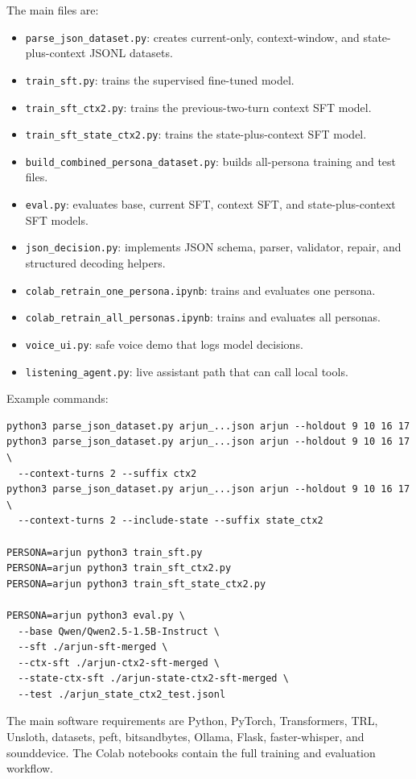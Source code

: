 \documentclass[11pt,a4paper]{article}
\begin{document}
The main files are:
\begin{itemize}
    \item \texttt{parse\_json\_dataset.py}: creates current-only, context-window, and state-plus-context JSONL datasets.
    \item \texttt{train\_sft.py}: trains the supervised fine-tuned model.
    \item \texttt{train\_sft\_ctx2.py}: trains the previous-two-turn context SFT model.
    \item \texttt{train\_sft\_state\_ctx2.py}: trains the state-plus-context SFT model.
    \item \texttt{build\_combined\_persona\_dataset.py}: builds all-persona training and test files.
    \item \texttt{eval.py}: evaluates base, current SFT, context SFT, and state-plus-context SFT models.
    \item \texttt{json\_decision.py}: implements JSON schema, parser, validator, repair, and structured decoding helpers.
    \item \texttt{colab\_retrain\_one\_persona.ipynb}: trains and evaluates one persona.
    \item \texttt{colab\_retrain\_all\_personas.ipynb}: trains and evaluates all personas.
    \item \texttt{voice\_ui.py}: safe voice demo that logs model decisions.
    \item \texttt{listening\_agent.py}: live assistant path that can call local tools.
\end{itemize}

Example commands:
\begin{verbatim}
python3 parse_json_dataset.py arjun_...json arjun --holdout 9 10 16 17
python3 parse_json_dataset.py arjun_...json arjun --holdout 9 10 16 17 \
  --context-turns 2 --suffix ctx2
python3 parse_json_dataset.py arjun_...json arjun --holdout 9 10 16 17 \
  --context-turns 2 --include-state --suffix state_ctx2

PERSONA=arjun python3 train_sft.py
PERSONA=arjun python3 train_sft_ctx2.py
PERSONA=arjun python3 train_sft_state_ctx2.py

PERSONA=arjun python3 eval.py \
  --base Qwen/Qwen2.5-1.5B-Instruct \
  --sft ./arjun-sft-merged \
  --ctx-sft ./arjun-ctx2-sft-merged \
  --state-ctx-sft ./arjun-state-ctx2-sft-merged \
  --test ./arjun_state_ctx2_test.jsonl
\end{verbatim}

The main software requirements are Python, PyTorch, Transformers, TRL, Unsloth, datasets, peft, bitsandbytes, Ollama, Flask, faster-whisper, and sounddevice. The Colab notebooks contain the full training and evaluation workflow.
\end{document}
